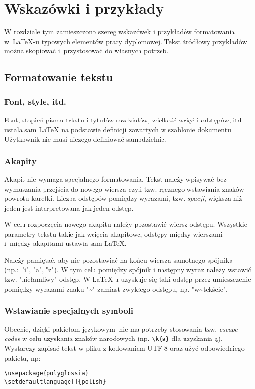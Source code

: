 \chapter{Wskazówki i przykłady}

W rozdziale tym zamieszczono szereg wskazówek i przykładów formatowania  w~{\LaTeX}-u typowych elementów pracy dyplomowej. Tekst źródłowy przykładów można skopiować i~przystosować do własnych potrzeb.

\section{Formatowanie tekstu}
\subsection{Font, style, itd.}
Font, stopień pisma tekstu i tytułów rozdziałów, wielkość wcięć i odstępów, itd. ustala sam {\LaTeX} na podstawie definicji zawartych w szablonie dokumentu. Użytkownik nie musi niczego definiować samodzielnie.

\subsection{Akapity}
Akapit nie wymaga  specjalnego formatowania. Tekst należy wpisywać bez wymuszania przejścia do nowego wiersza czyli tzw. ręcznego wstawiania znaków powrotu karetki. Liczba                       odstępów                        pomiędzy wyrazami,              tzw. \textit{spacji},   większa niż jeden jest  interpretowana jak jeden odstęp.

W celu rozpoczęcia  nowego akapitu należy pozostawić wiersz odstępu. Wszystkie parametry tekstu takie jak wcięcia akapitowe, odstępy między wierszami i~między akapitami  ustawia sam  {\LaTeX}. 

Należy pamiętać, aby nie pozostawiać na końcu wiersza samotnego spójnika (np.:~"i", "a", "z").  W tym celu pomiędzy spójnik i następny wyraz należy wstawić tzw. "niełamliwy" odstęp. W  \mbox{{\LaTeX}-u} uzyskuje się taki odstęp przez umieszczenie pomiędzy wyrazami znaku "\textasciitilde" zamiast zwykłego odstępu, np. "w\textasciitilde tekście".


\subsection{Wstawianie specjalnych symboli}
Obecnie, dzięki pakietom językowym, nie ma potrzeby stosowania tzw. \textit{escape codes}  w celu uzyskania znaków narodowych (np.  \texttt{\textbackslash k\{a\}} dla uzyskania ą). Wystarczy zapisać tekst w pliku z kodowaniem UTF-8 oraz użyć odpowiedniego pakietu, np:
{\footnotesize \begin{verbatim}
\usepackage{polyglossia}
\setdefaultlanguage[]{polish}
\end{verbatim}
}

